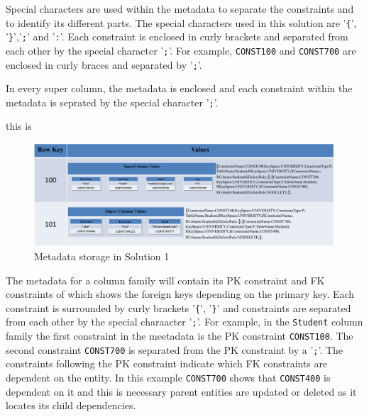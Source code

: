 Special characters are used within the metadata to separate the constraints and
to identify its different parts. The special characters used in this solution
are '\texttt{\{}', '\texttt{\}}','\texttt{;}' and '\texttt{:}'. Each constraint
is enclosed in curly brackets and separated from each other by the special
character '\texttt{;}'. For example, \texttt{CONST100} and \texttt{CONST700} are
enclosed in curly braces and separated by '\texttt{;}'.

	
	In every super column, the metadata is enclosed  and each
	constraint within the metadata is seprated by the special character
	'\texttt{;}'.
	
	 this is
	
	

	\begin{figure}[H]
		\centering
		\includegraphics[width=1\textwidth]{./figure/Solutions/Solution1-Student-MD.png}
		\caption{Metadata storage in Solution 1}\label{f:sol1-Student-md}
	\end{figure}

	The metadata for a column family will contain its \ac{PK} constraint and
	\ac{FK} constraints of \texttt{} which shows the foreign keys depending on the
	primary key.
	Each constraint is surrounded by curly brackets '\texttt{\{}', '\texttt{\}}'
	and constraints are separated from each other by the special charaacter
 	'\texttt{;}'. For example, in the \texttt{Student} column family the first constraint
 	in the meetadata is the \ac{PK} constraint \texttt{CONST100}. The
	second constraint \texttt{CONST700} is separated from the \ac{PK} constraint by
	a '\texttt{;}'. The constraints following the \ac{PK} constraint indicate
	which \ac{FK} constraints are dependent on the entity.
	In this example \texttt{CONST700} shows that \texttt{CONST400} is dependent on
	it and this is necessary parent entities are updated or deleted as
	it locates its child dependencies.


